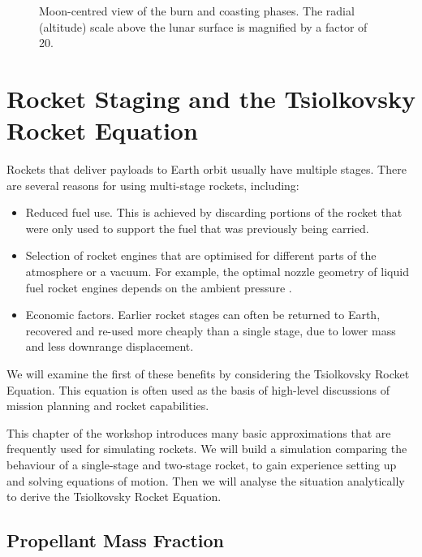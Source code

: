 \documentclass[12pt,openany]{book}
\begin{document}
\begin{figure}[htbp]
  \centering
  \resizebox{0.5\textwidth}{!}{}
  \caption{Moon-centred view of the burn and coasting phases. The radial (altitude) scale above the lunar surface is magnified by a factor of 20.}
  \label{fig:lunar-ascent-moon-view}
\end{figure}

\chapter{Rocket Staging and the Tsiolkovsky Rocket Equation}

Rockets that deliver payloads to Earth orbit usually have multiple stages. There are several reasons for using multi-stage rockets, including:

\begin{itemize}
\item Reduced fuel use. This is achieved by discarding portions of the rocket that were only used to support the fuel that was previously being carried.
\item Selection of rocket engines that are optimised for different parts of the atmosphere or a vacuum. For example, the optimal nozzle geometry of liquid fuel rocket engines depends on the ambient pressure \cite{marble1964,huzel1967}.
\item Economic factors. Earlier rocket stages can often be returned to Earth, recovered and re-used more cheaply than a single stage, due to lower mass and less downrange displacement.
\end{itemize}

We will examine the first of these benefits by considering the Tsiolkovsky Rocket Equation. This equation is often used as the basis of high-level discussions of mission planning and rocket capabilities.

This chapter of the workshop introduces many basic approximations that are frequently used for simulating rockets. We will build a simulation comparing the behaviour of a single-stage and two-stage rocket, to gain experience setting up and solving equations of motion. Then we will analyse the situation analytically to derive the Tsiolkovsky Rocket Equation.

\section{Propellant Mass Fraction}
\end{document}
